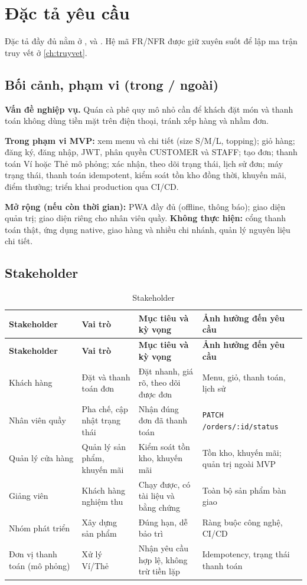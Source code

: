 \chapter{Đặc tả yêu cầu}\label{ch:yeucau}
Đặc tả đầy đủ nằm ở ,  và . Hệ mã FR/NFR được giữ xuyên suốt để lập ma trận truy vết ở \cref{ch:truyvet}.

\section{Bối cảnh, phạm vi (trong / ngoài)}\label{sec:se-phamvi}
\textbf{Vấn đề nghiệp vụ.} Quán cà phê quy mô nhỏ cần để khách đặt món và thanh toán không dùng tiền mặt trên điện thoại, tránh xếp hàng và nhầm đơn.

\textbf{Trong phạm vi MVP:} xem menu và chi tiết (size S/M/L, topping); giỏ hàng; đăng ký, đăng nhập, JWT, phân quyền CUSTOMER và STAFF; tạo đơn; thanh toán Ví hoặc Thẻ mô phỏng; xác nhận, theo dõi trạng thái, lịch sử đơn; máy trạng thái, thanh toán idempotent, kiểm soát tồn kho đồng thời, khuyến mãi, điểm thưởng; triển khai production qua CI/CD.

\textbf{Mở rộng (nếu còn thời gian):} PWA đầy đủ (offline, thông báo); giao diện quản trị; giao diện riêng cho nhân viên quầy. \textbf{Không thực hiện:} cổng thanh toán thật, ứng dụng native, giao hàng và nhiều chi nhánh, quản lý nguyên liệu chi tiết.

\section{Stakeholder}\label{sec:se-stakeholder}
\begin{longtable}{@{}p{3cm}p{3cm}p{4.6cm}p{3.6cm}@{}}
\caption{Stakeholder}\label{tab:stakeholder}\\
\toprule \textbf{Stakeholder} & \textbf{Vai trò} & \textbf{Mục tiêu và kỳ vọng} & \textbf{Ảnh hưởng đến yêu cầu} \\ \midrule \endfirsthead
\toprule \textbf{Stakeholder} & \textbf{Vai trò} & \textbf{Mục tiêu và kỳ vọng} & \textbf{Ảnh hưởng đến yêu cầu} \\ \midrule \endhead
\bottomrule \endlastfoot
Khách hàng & Đặt và thanh toán đơn & Đặt nhanh, giá rõ, theo dõi được đơn & Menu, giỏ, thanh toán, lịch sử \\
Nhân viên quầy & Pha chế, cập nhật trạng thái & Nhận đúng đơn đã thanh toán & \texttt{PATCH /orders/:id/status} \\
Quản lý cửa hàng & Quản lý sản phẩm, khuyến mãi & Kiểm soát tồn kho, khuyến mãi & Tồn kho, khuyến mãi; quản trị ngoài MVP \\
Giảng viên & Khách hàng nghiệm thu & Chạy được, có tài liệu và bằng chứng & Toàn bộ sản phẩm bàn giao \\
Nhóm phát triển & Xây dựng sản phẩm & Đúng hạn, dễ bảo trì & Ràng buộc công nghệ, CI/CD \\
Đơn vị thanh toán (mô phỏng) & Xử lý Ví/Thẻ & Nhận yêu cầu hợp lệ, không trừ tiền lặp & Idempotency, trạng thái thanh toán \\
\end{longtable}

